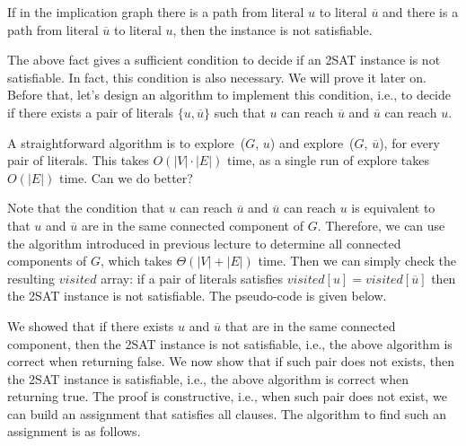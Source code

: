 \begin{fact}
If in the implication graph there is a path from literal $u$ to literal $\overline{u}$ and there is a
path from literal $\overline{u}$ to literal $u$, then the instance is not satisfiable.
\end{fact}

The above fact gives a sufficient condition to decide if an 2SAT instance is not satisfiable.
In fact, this condition is also necessary. We will prove it later on.
Before that, let's design an algorithm to implement this condition, i.e., to decide if there
exists a pair of literals $\{u,\overline{u}\}$ such that $u$ can reach $\overline{u}$ and $\overline{u}$ can reach $u$.

A straightforward algorithm is to explore~($G$, $u$) and explore~($G$, $\overline{u}$), for every pair of literals.
This takes $O(|V|\cdot |E|)$ time, as a single run of explore takes $O(|E|)$ time. Can we do better?

Note that the condition that $u$ can reach $\overline{u}$ and $\overline{u}$ can reach $u$
is equivalent to that $u$ and $\overline{u}$ are in the same connected component of $G$.
Therefore, we can use the algorithm introduced in previous lecture to determine all connected components of $G$, which takes $\Theta(|V| + |E|)$ time.
Then we can simply check the resulting $visited$ array: if a pair of literals satisfies $visited[u] = visited[\overline{u}]$ then the 2SAT instance is not satisfiable.
The pseudo-code is given below.

\begin{minipage}{0.8\textwidth}
	\xxx
	\xxx
	\xxx
	\xxx
	\xxx
	\xxx
	\xxx
	\xxx
\end{minipage}

We showed that if there exists $u$ and $\overline{u}$ that are in the same connected
component, then the 2SAT instance is not satisfiable, i.e., the above
algorithm is correct when returning false.  We now show that if such
pair does not exists, then the 2SAT instance is satisfiable, i.e., the
above algorithm is correct when returning true.
The proof is constructive, i.e., when such pair does not exist, we can
build an assignment that satisfies all clauses.
The algorithm to find such an assignment is as follows. %

